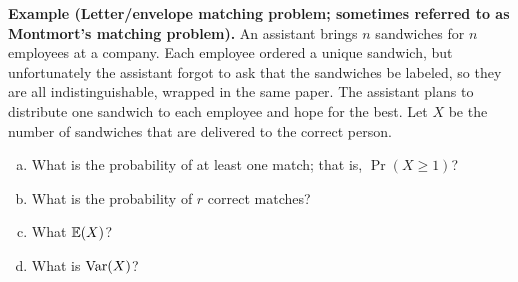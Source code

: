 \begin{exercise}\label{prob.matching} \textbf{Example (Letter/envelope matching problem; sometimes referred to as Montmort's matching problem).} An assistant brings \(n\) sandwiches for \(n\) employees at a company. Each employee ordered a unique sandwich, but unfortunately the assistant forgot to ask that the sandwiches be labeled, so they are all indistinguishable, wrapped in the same paper. The assistant plans to distribute one sandwich to each employee and hope for the best. Let \(X\) be the number of sandwiches that are delivered to the correct person.

\begin{enumerate}[(a)]

\item What is the probability of at least one match; that is, \(\Pr(X \geq 1)\)?

\item What is the probability of \(r\) correct matches?

\item What \(\mathbb{E}(X)\)?

\item What is \(\mathrm{Var}(X)\)?

\end{enumerate}

\end{exercise}


